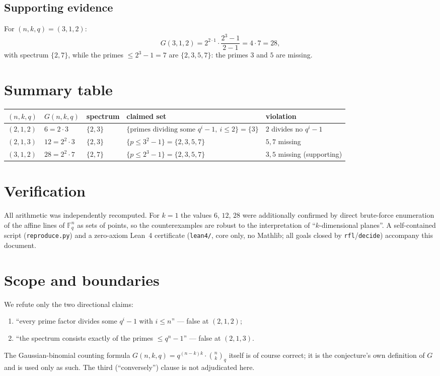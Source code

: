 \documentclass[11pt]{article}
\begin{document}
\subsection*{Supporting evidence}
For $(n,k,q) = (3,1,2)$:
\[
G(3,1,2) = 2^{2\cdot 1}\cdot\frac{2^3-1}{2-1} = 4\cdot 7 = 28,
\]
with spectrum $\{2,7\}$, while the primes $\le 2^3-1 = 7$ are $\{2,3,5,7\}$:
the primes $3$ and $5$ are missing.

\section{Summary table}

\begin{table}[h]
\centering
\small
\begin{tabular}{@{}lllll@{}}
\toprule
$(n,k,q)$ & $G(n,k,q)$ & spectrum & claimed set & violation \\
\midrule
$(2,1,2)$ & $6 = 2\cdot 3$ & $\{2,3\}$ &
$\{\text{primes dividing some } q^i-1,\ i\le 2\} = \{3\}$ &
$2$ divides no $q^i-1$ \\
$(2,1,3)$ & $12 = 2^2\cdot 3$ & $\{2,3\}$ &
$\{p \le 3^2-1\} = \{2,3,5,7\}$ &
$5, 7$ missing \\
$(3,1,2)$ & $28 = 2^2\cdot 7$ & $\{2,7\}$ &
$\{p \le 2^3-1\} = \{2,3,5,7\}$ &
$3, 5$ missing (supporting) \\
\bottomrule
\end{tabular}
\end{table}

\section{Verification}

All arithmetic was independently recomputed. For $k=1$ the values $6$, $12$,
$28$ were additionally confirmed by direct brute-force enumeration of the
affine lines of $\mathbb{F}_q^n$ as sets of points, so the counterexamples are
robust to the interpretation of ``$k$-dimensional planes''.
A self-contained script (\texttt{reproduce.py}) and a zero-axiom Lean~4
certificate (\texttt{lean4/}, core only, no Mathlib; all goals closed by
\texttt{rfl}/\texttt{decide}) accompany this document.

\section{Scope and boundaries}

We refute only the two directional claims:
\begin{enumerate}
  \item ``every prime factor divides some $q^i-1$ with $i \le n$'' --- false at
        $(2,1,2)$;
  \item ``the spectrum consists exactly of the primes $\le q^n-1$'' --- false at
        $(2,1,3)$.
\end{enumerate}
The Gaussian-binomial counting formula
$G(n,k,q) = q^{(n-k)k}\cdot\binom{n}{k}_q$ itself is of course correct; it is
the conjecture's own definition of $G$ and is used only as such. The third
(``conversely'') clause is not adjudicated here.
\end{document}
